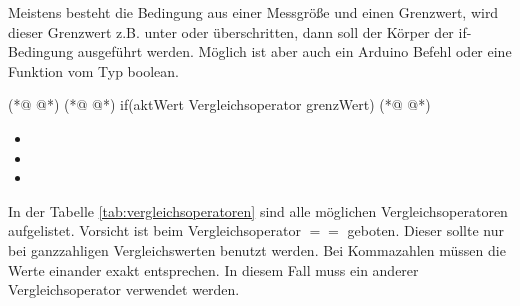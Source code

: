 Meistens besteht die Bedingung aus einer Messgröße und einen Grenzwert, wird dieser Grenzwert z.B. unter oder überschritten, dann soll der Körper der if-Bedingung ausgeführt werden. Möglich ist aber auch ein Arduino Befehl oder eine Funktion vom Typ boolean. 
\begin{multicols}{2}
\null\vfill 
\begin{arduinoCode}{}{}
   (*@  @*)           (*@  @*)
if(aktWert Vergleichsoperator grenzWert) 
                                (*@  @*)
\end{arduinoCode}
\vfill\null 
\columnbreak

\null\vfill
\begin{itemize}
  \itemsep15pt
  \item[] 
  \item[] 
  \item[] 
  
  \end{itemize}
\vfill \null

\end{multicols}

In der Tabelle \ref{tab:vergleichsoperatoren} sind alle möglichen Vergleichsoperatoren aufgelistet. Vorsicht ist beim Vergleichsoperator $==$ geboten. Dieser sollte nur bei ganzzahligen Vergleichswerten benutzt werden. Bei Kommazahlen müssen die Werte einander exakt entsprechen. In diesem Fall muss ein anderer Vergleichsoperator verwendet werden.    

